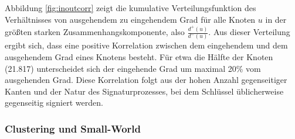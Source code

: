 Abbildung \ref{fig:inoutcorr} zeigt die kumulative Verteilungsfunktion
des Verhältnisses von ausgehendem zu eingehendem Grad für alle
Knoten $u$ in der größten starken Zusammenhangskomponente, also
$\frac{d^+(u)}{d^-(u)}$. Aus dieser Verteilung ergibt sich, dass eine
positive Korrelation zwischen dem eingehendem und dem ausgehendem Grad
eines Knotens besteht. Für etwa die Hälfte der Knoten (21.817)
unterscheidet sich der eingehende Grad um maximal 20\% vom ausgehenden
Grad. Diese Korrelation folgt aus der hohen Anzahl gegenseitiger
Kanten und der Natur des Signaturprozesses, bei dem Schlüssel
üblicherweise gegenseitig signiert werden.


\subsubsection{Clustering und Small-World}
\label{sec:clustering-und-small}

